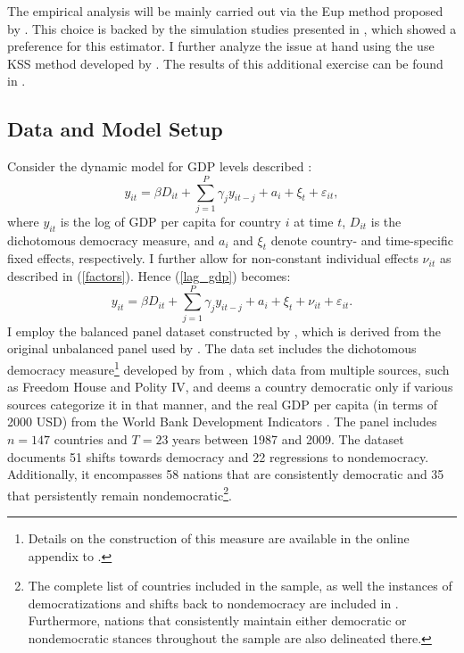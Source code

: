 The empirical analysis will be mainly carried out via the \ac{Eup} method proposed by \citet{bada2014parameter}. This choice is backed by the simulation studies presented in , which showed a preference for this estimator. I further analyze the issue at hand using the use \ac{KSS} method developed by \citet{kneip2012new}.  The results of this additional exercise can be found in .
 
\subsection{Data and Model Setup}

Consider the dynamic model for \ac{GDP} levels described \citet{acemoglu2019democracy}:
\begin{equation}\label{lag_gdp}
 y_{it} = \beta D_{it} + \sum_{j=1}^P \gamma_j y_{it-j} + a_i + \xi_t  + \varepsilon_{it},
\end{equation}
where $y_{it}$ is the log of GDP per capita for country $i$ at time $t$, $D_{it}$ is the dichotomous democracy measure, and $a_{i}$ and $\xi_t$ denote country- and time-specific fixed effects, respectively. I further allow for non-constant individual effects $\nu_{it}$ as described in (\ref{factors}). Hence (\ref{lag_gdp}) becomes:
\begin{equation}\label{lag_gdp_factor}
 y_{it} = \beta D_{it} + \sum_{j=1}^P \gamma_j y_{it-j} + a_i + \xi_t + \nu_{it} + \varepsilon_{it}.
\end{equation}
I employ the balanced panel dataset constructed by \citet{chen2019mastering}, which is derived from the original unbalanced panel used by \citet{acemoglu2019democracy}. The data set includes the dichotomous democracy measure\footnote{Details on the construction of this measure are available in the online appendix to \citet{acemoglu2019democracy}.} developed by from \citet{acemoglu2019democracy}, which data from multiple sources, such as Freedom House and Polity IV, and deems a country democratic only if various sources categorize it in that manner, and the real \ac{GDP} per capita (in terms of 2000 USD)  from the World Bank Development Indicators \citep{world2012world}. The panel includes $n = 147$ countries and $T = 23$ years between 1987 and 2009. The dataset documents 51 shifts towards democracy and 22 regressions to nondemocracy. Additionally, it encompasses 58 nations that are consistently democratic and 35 that persistently remain nondemocratic\footnote{The complete list of countries included in the sample, as well the instances of democratizations and shifts back to nondemocracy are included in . Furthermore, nations that consistently maintain either democratic or nondemocratic stances throughout the sample are also delineated there.}.   

